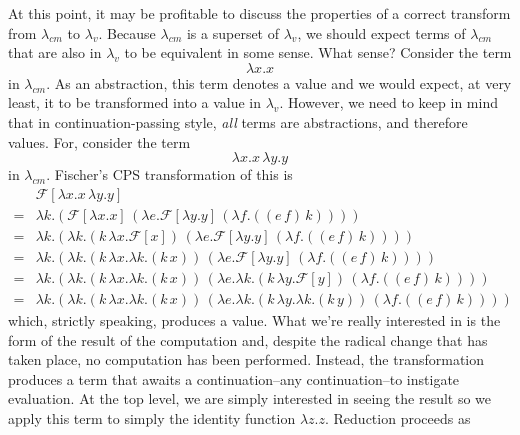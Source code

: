 \documentclass[ms,electronic,twosidetoc,letterpaper,chaptercenter,parttop]{byumsphd}
\begin{document}
At this point, it may be profitable to discuss the properties of a correct transform from
$\lambda_{cm}$ to $\lambda_{v}$. Because $\lambda_{cm}$ is a superset of $\lambda_{v}$, we
should expect terms of $\lambda_{cm}$ that are also in $\lambda_{v}$ to be equivalent in
some sense. What sense? Consider the term
\[
\lambda x.x
\]
in $\lambda_{cm}$. As an abstraction, this term denotes a value and we would expect, at very
least, it to be transformed into a value in $\lambda_{v}$. However, we need to keep in
mind that in continuation-passing style, \emph{all} terms are abstractions, and therefore
values. For, consider the term
\[
\lambda x.x\,\lambda y.y
\]
in $\lambda_{cm}$. Fischer's CPS transformation of this is
\begin{align*}
            &\mathcal{F}[\lambda x.x\,\lambda y.y]\\
= &\lambda k.(\mathcal{F}[\lambda x.x]\,(\lambda e.\mathcal{F}[\lambda y.y]\,(\lambda f.((e\,f)\,k))))\\
= &\lambda k.(\lambda k.(k\,\lambda x.\mathcal{F}[x])\,(\lambda e.\mathcal{F}[\lambda y.y]\,(\lambda f.((e\,f)\,k))))\\
= &\lambda k.(\lambda k.(k\,\lambda x.\lambda k.(k\,x))\,(\lambda e.\mathcal{F}[\lambda y.y]\,(\lambda f.((e\,f)\,k))))\\
= &\lambda k.(\lambda k.(k\,\lambda x.\lambda k.(k\,x))\,(\lambda e.\lambda k.(k\,\lambda y.\mathcal{F}[y])\,(\lambda f.((e\,f)\,k))))\\
= &\lambda k.(\lambda k.(k\,\lambda x.\lambda k.(k\,x))\,(\lambda e.\lambda k.(k\,\lambda y.\lambda k.(k\,y))\,(\lambda f.((e\,f)\,k))))
\end{align*}
which, strictly speaking, produces a value. What we're really interested in is the form of 
the result of the computation and, despite the radical change that has taken place, no 
computation has been performed. Instead, the transformation produces a term that awaits 
a continuation--any continuation--to instigate evaluation. At the top level, we are simply 
interested in seeing the result so we apply this term to simply the identity function 
$\lambda z.z$. Reduction proceeds as
\end{document}
